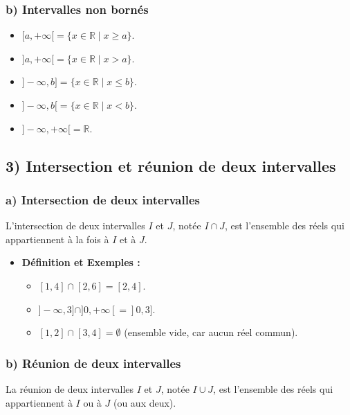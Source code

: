 \documentclass[12pt,a4paper]{article}
\begin{document}
\subsubsection*{\color{myred} b) Intervalles non bornés}
\begin{itemize}
    \item $[a, +\infty[ = \{ x \in \mathbb{R} \mid x \geq a \}$.
    \item $]a, +\infty[ = \{ x \in \mathbb{R} \mid x > a \}$.
    \item $]-\infty, b] = \{ x \in \mathbb{R} \mid x \leq b \}$.
    \item $]-\infty, b[ = \{ x \in \mathbb{R} \mid x < b \}$.
    \item $]-\infty, +\infty[ = \mathbb{R}$.
\end{itemize}

\subsection*{\color{myred} 3) Intersection et réunion de deux intervalles}

\subsubsection*{\color{myred} a) Intersection de deux intervalles}
L'intersection de deux intervalles $I$ et $J$, notée $I \cap J$, est l'ensemble des réels qui appartiennent à la fois à $I$ et à $J$.

\begin{itemize}
    \item \textbf{Définition et Exemples :}
    \begin{itemize}
        \item $[1, 4] \cap [2, 6] = [2, 4]$.
        \item $]-\infty, 3] \cap ]0, +\infty[ = ]0, 3]$.
        \item $[1, 2] \cap [3, 4] = \emptyset$ (ensemble vide, car aucun réel commun).
    \end{itemize}
\end{itemize}

\subsubsection*{\color{myred} b) Réunion de deux intervalles}
La réunion de deux intervalles $I$ et $J$, notée $I \cup J$, est l'ensemble des réels qui appartiennent à $I$ ou à $J$ (ou aux deux).
\end{document}

